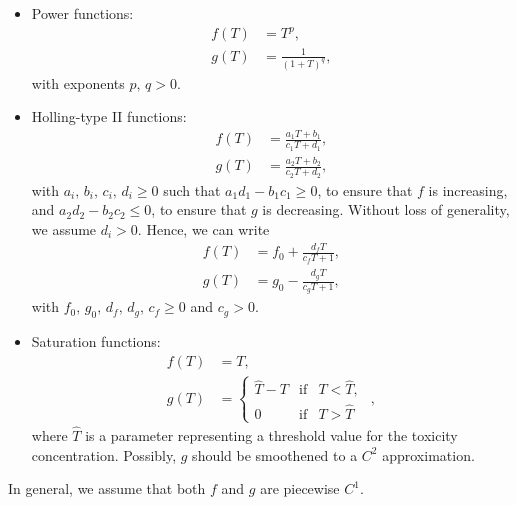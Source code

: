 \documentclass[a4paper,10pt,abstract=true,parskip=true]{scrartcl}
\theoremstyle{remark}
\numberwithin{equation}{section}
\numberwithin{thm}{section}
\begin{document}
\begin{itemize}
    \item Power functions:  \begin{subequations}\label{eq:fg_choices_powerfct}
        \begin{align}
            f(T) &= T^p,\\
            g(T) &= \frac{1}{(1+T)^q},
        \end{align}
    \end{subequations}
    with exponents $p,\, q > 0$.
    \item Holling-type II functions:
    \begin{subequations}\label{eq:fg_choices_HollingII}
        \begin{align}
         f(T) &= \frac{a_1 T + b_1}{c_1 T + d_1},\\
         g(T) &= \frac{a_2 T + b_2}{c_2 T + d_2},
        \end{align}
    \end{subequations}
    with $a_i,\, b_i,\, c_i,\, d_i \geq 0$ such that $a_1 d_1 - b_1 c_1 \geq 0$, to ensure that $f$ is increasing, and $a_2d_2-b_2 c_2 \leq 0$, to ensure that $g$ is decreasing. Without loss of generality, we assume $d_i>0$. Hence, we can write
    \begin{subequations}\label{eq:fg_choices_HollingII_rescaled}
        \begin{align}
         f(T) &= f_0 + \frac{d_f T}{c_f T+1},\\
         g(T) &= g_0 - \frac{d_g T}{c_g T+1},
        \end{align}
    \end{subequations}
    with $f_0,\, g_0, \, d_f, \, d_g, \, c_f \geq 0$ and $c_g > 0$.
    \item Saturation functions:
    \begin{subequations}\label{eq:fg_choices_sattrans}
        \begin{align}
            f(T) &= T,\\
            g(T) &= \left\{ \begin{array}{rcl} \hat{T} - T & \text{if} & T < \hat{T},\\
            0 & \text{if} &T > \hat{T}
            \end{array} \right.~\, ,
        \end{align}
    \end{subequations}
    where $\hat{T}$ is a parameter representing a threshold value for the toxicity concentration. Possibly, $g$ should be smoothened to a $C^2$ approximation.
\end{itemize}
In general, we assume that both $f$ and $g$ are piecewise $C^1$.
\end{document}
